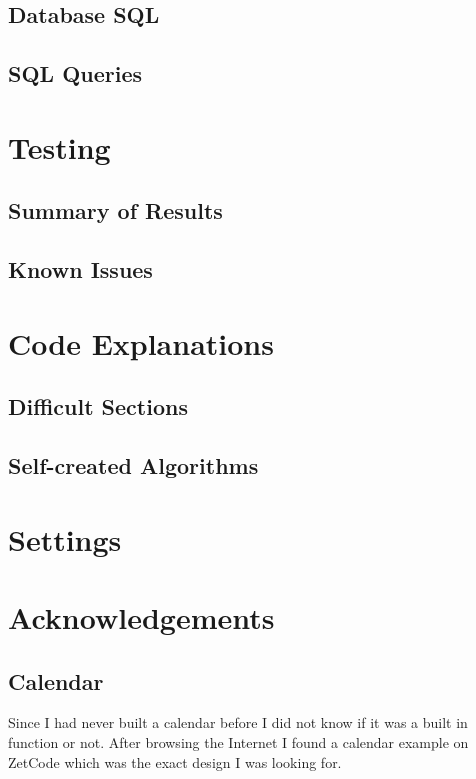 \subsection{Database SQL}

\subsection{SQL Queries}

\section{Testing}

\subsection{Summary of Results}

\subsection{Known Issues}

\section{Code Explanations}

\subsection{Difficult Sections}

\subsection{Self-created Algorithms}

\section{Settings}

\section{Acknowledgements}

\subsection{Calendar}

Since I had never built a calendar before I did not know if it was a built in function or not. After browsing the Internet I found a calendar example on ZetCode which was the exact design I was looking for. 

